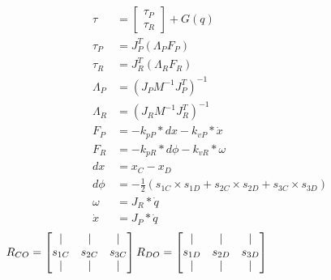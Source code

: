 \documentclass[10pt,a4paper,notitlepage]{report}
\begin{document}
\begin{align}
\tau &= \begin{bmatrix}
\tau_{P}\\
\tau_{R}
\end{bmatrix}+G(q) \\
\tau_{P} &= J^{T}_{P}(\Lambda_{P}F_{P})\\
\tau_{R} &= J^{T}_{R}(\Lambda_{R}F_{R})\\
\Lambda_{P} &= (J_{P}M^{-1}J_{P}^{T})^{-1}\\
\Lambda_{R} &= (J_{R}M^{-1}J_{R}^{T})^{-1} \\
F_{P} &= -k_{pP}*dx - k_{vP}*\dot{x}\\
F_{R} &= -k_{pR}*d\phi - k_{vR}*\omega  \\
dx &= x_{C} - x_{D}\\
d\phi &= -\frac{1}{2}(s_{1C}\times s_{1D}+s_{2C}\times s_{2D}+s_{3C}\times s_{3D})\\
\omega &= J_{R}*\dot{q}\\
\dot{x} &= J_{P}*\dot{q}\\
\end{align}
$R_{CO} = 
\begin{bmatrix}
\vert & \vert & \vert\\
s_{1C} & s_{2C} & s_{3C}\\
\vert & \vert & \vert\\
\end{bmatrix}\\
R_{DO} = 
\begin{bmatrix}
\vert & \vert & \vert\\
s_{1D} & s_{2D} & s_{3D}\\
\vert & \vert & \vert\\
\end{bmatrix}
$
\end{document}
